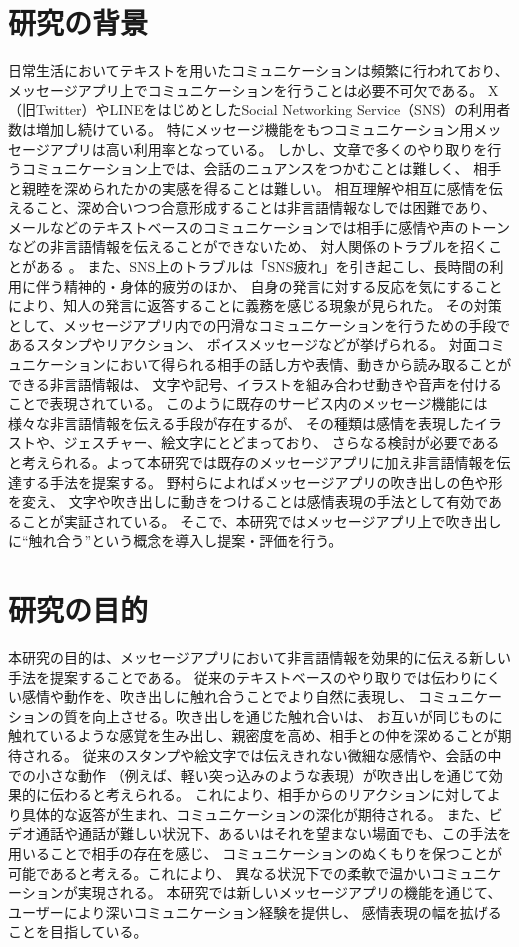 \documentclass[11pt,a4paper]{ltjsreport}
\begin{document}
\section{研究の背景}
日常生活においてテキストを用いたコミュニケーションは頻繁に行われており、
メッセージアプリ上でコミュニケーションを行うことは必要不可欠である。
X（旧Twitter）やLINEをはじめとしたSocial Networking Service（SNS）の利用者数は増加し続けている。
特にメッセージ機能をもつコミュニケーション用メッセージアプリは高い利用率となっている\cite{Web1}。
しかし、文章で多くのやり取りを行うコミュニケーション上では、会話のニュアンスをつかむことは難しく、
相手と親睦を深められたかの実感を得ることは難しい。
相互理解や相互に感情を伝えること、深め合いつつ合意形成することは非言語情報なしでは困難であり、
メールなどのテキストベースのコミュニケーションでは相手に感情や声のトーンなどの非言語情報を伝えることができないため、
対人関係のトラブルを招くことがある \cite{Thesis2}。
また、SNS上のトラブルは「SNS疲れ」を引き起こし、長時間の利用に伴う精神的・身体的疲労のほか、
自身の発言に対する反応を気にすることにより、知人の発言に返答することに義務を感じる現象が見られた\cite{Thesis2}。
その対策として、メッセージアプリ内での円滑なコミュニケーションを行うための手段であるスタンプやリアクション、
ボイスメッセージなどが挙げられる。
対面コミュニケーションにおいて得られる相手の話し方や表情、動きから読み取ることができる非言語情報は、
文字や記号、イラストを組み合わせ動きや音声を付けることで表現されている。
このように既存のサービス内のメッセージ機能には様々な非言語情報を伝える手段が存在するが、
その種類は感情を表現したイラストや、ジェスチャー、絵文字にとどまっており、
さらなる検討が必要であると考えられる。よって本研究では既存のメッセージアプリに加え非言語情報を伝達する手法を提案する。
野村らによればメッセージアプリの吹き出しの色や形を変え、
文字や吹き出しに動きをつけることは感情表現の手法として有効であることが実証されている\cite{Thesis2}。
そこで、本研究ではメッセージアプリ上で吹き出しに“触れ合う”という概念を導入し提案・評価を行う。



\section{研究の目的}
本研究の目的は、メッセージアプリにおいて非言語情報を効果的に伝える新しい手法を提案することである。
従来のテキストベースのやり取りでは伝わりにくい感情や動作を、吹き出しに触れ合うことでより自然に表現し、
コミュニケーションの質を向上させる。吹き出しを通じた触れ合いは、
お互いが同じものに触れているような感覚を生み出し、親密度を高め、相手との仲を深めることが期待される。
従来のスタンプや絵文字では伝えきれない微細な感情や、会話の中での小さな動作
（例えば、軽い突っ込みのような表現）が吹き出しを通じて効果的に伝わると考えられる。
これにより、相手からのリアクションに対してより具体的な返答が生まれ、コミュニケーションの深化が期待される。
また、ビデオ通話や通話が難しい状況下、あるいはそれを望まない場面でも、この手法を用いることで相手の存在を感じ、
コミュニケーションのぬくもりを保つことが可能であると考える。これにより、
異なる状況下での柔軟で温かいコミュニケーションが実現される。
本研究では新しいメッセージアプリの機能を通じて、ユーザーにより深いコミュニケーション経験を提供し、
感情表現の幅を拡げることを目指している。
\end{document}

